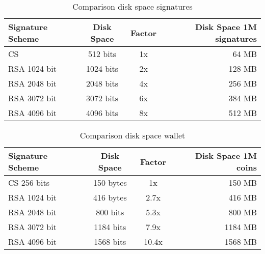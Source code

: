 \begin{table}[ht]
    \centering
    \setupBfhTabular
    \begin{tabular}{lccr}
        \rowcolor{BFH-tablehead}
        \textbf{Signature Scheme} & \textbf{Disk Space} & \textbf{Factor} & \textbf{Disk Space 1M signatures}\\\hline
        CS & 512 bits & 1x & 64 MB\\\hline
        RSA 1024 bit & 1024 bits & 2x & 128 MB \\\hline
        RSA 2048 bit & 2048 bits & 4x & 256 MB\\\hline
        RSA 3072 bit & 3072 bits & 6x & 384 MB\\\hline
        RSA 4096 bit & 4096 bits & 8x & 512 MB\\\hline
    \end{tabular}
    \caption{Comparison disk space signatures}
    \label{tab:comp-sign-space}
\end{table}

\begin{table}[ht]
    \centering
    \setupBfhTabular
    \begin{tabular}{lccr}
        \rowcolor{BFH-tablehead}
        \textbf{Signature Scheme} & \textbf{Disk Space} & \textbf{Factor} & \textbf{Disk Space 1M coins}\\\hline
        CS 256 bits & 150 bytes & 1x & 150 MB\\\hline
        RSA 1024 bit & 416 bytes & 2.7x & 416 MB \\\hline
        RSA 2048 bit & 800 bits & 5.3x & 800 MB\\\hline
        RSA 3072 bit & 1184 bits & 7.9x & 1184 MB\\\hline
        RSA 4096 bit & 1568 bits & 10.4x & 1568 MB\\\hline
    \end{tabular}
    \caption{Comparison disk space wallet}
    \label{tab:comp-wallet-space}
\end{table}


